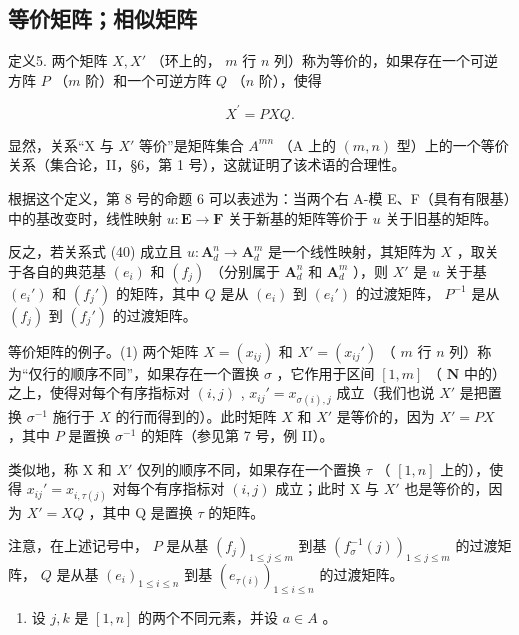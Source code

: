 \subsection{等价矩阵；相似矩阵}

定义5. 两个矩阵 \(X, X'\) （环上的， \(m\) 行 \(n\) 列）称为等价的，如果存在一个可逆方阵 \(P\) （\(m\) 阶）和一个可逆方阵 \(Q\) （\(n\) 阶），使得

\[
X ^ {\prime} = P X Q.\tag{40}
\]

显然，关系“X 与 \(X'\) 等价”是矩阵集合 \(A^{mn}\) （A 上的 \((m, n)\) 型）上的一个等价关系（集合论，II，§6，第 1 号），这就证明了该术语的合理性。

根据这个定义，第 8 号的命题 6 可以表述为：当两个右 A-模 E、F（具有有限基）中的基改变时，线性映射 \(u \colon \mathbf{E} \to \mathbf{F}\) 关于新基的矩阵等价于 \(u\) 关于旧基的矩阵。

反之，若关系式 (40) 成立且 \(u \colon \mathbf{A}_d^n \to \mathbf{A}_d^m\) 是一个线性映射，其矩阵为 \(X\) ，取关于各自的典范基 \((e_i)\) 和 \((f_j)\) （分别属于 \(\mathbf{A}_d^n\) 和 \(\mathbf{A}_d^m\) ），则 \(X'\) 是 \(u\) 关于基 \((e_i')\) 和 \((f_j')\) 的矩阵，其中 \(Q\) 是从 \((e_i)\) 到 \((e_i')\) 的过渡矩阵， \(P^{-1}\) 是从 \((f_j)\) 到 \((f_j')\) 的过渡矩阵。

等价矩阵的例子。(1) 两个矩阵 \(X = (x_{ij})\) 和 \(X' = (x_{ij}')\) （ \(m\) 行 \(n\) 列）称为“仅行的顺序不同”，如果存在一个置换 \(\sigma\) ，它作用于区间 \([1, m]\) （ \(\mathbf{N}\) 中的）之上，使得对每个有序指标对 \((i,j)\) , \(x_{ij}' = x_{\sigma(i),j}\) 成立（我们也说 \(X'\) 是把置换 \(\sigma^{-1}\) 施行于 \(X\) 的行而得到的）。此时矩阵 \(X\) 和 \(X'\) 是等价的，因为 \(X' = PX\) ，其中 \(P\) 是置换 \(\sigma^{-1}\) 的矩阵（参见第 7 号，例 II）。

类似地，称 X 和 \(X'\) 仅列的顺序不同，如果存在一个置换 \(\tau\) （ \([1, n]\) 上的），使得 \(x_{ij}' = x_{i,\tau(j)}\) 对每个有序指标对 \((i,j)\) 成立；此时 X 与 \(X'\) 也是等价的，因为 \(X' = XQ\) ，其中 Q 是置换 \(\tau\) 的矩阵。

注意，在上述记号中， \(P\) 是从基 \((f_j)_{1 \leqslant j \leqslant m}\) 到基 \((f_\sigma^{-1}(j))_{1 \leqslant j \leqslant m}\) 的过渡矩阵， \(Q\) 是从基 \((e_i)_{1 \leqslant i \leqslant n}\) 到基 \((e_{\tau(i)})_{1 \leqslant i \leqslant n}\) 的过渡矩阵。

\begin{enumerate}
\def\labelenumi{(\arabic{enumi})}
\setcounter{enumi}{1}
\tightlist
\item
  设 \(j, k\) 是 \([1, n]\) 的两个不同元素，并设 \(a \in A\) 。
\end{enumerate}

